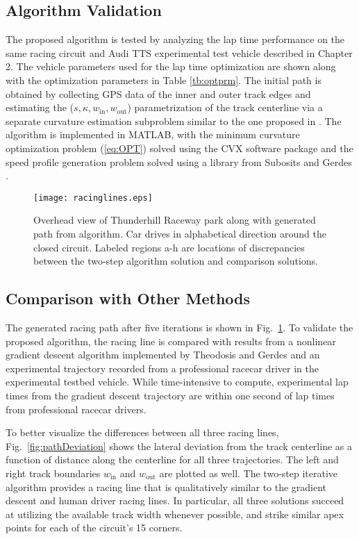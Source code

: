 \subsection{Algorithm Validation}
The proposed algorithm is tested by analyzing the lap time performance on
 the same racing circuit and Audi TTS experimental test vehicle described in
Chapter 2. The vehicle parameters 
used for the lap time optimization are shown along with the optimization parameters in Table \ref{tb:optprm}.
 The initial path is obtained by collecting GPS data of the inner and outer track edges and estimating the ($s, \kappa, w_\mathrm{in}, w_\mathrm{out}$)
 parametrization of the track centerline via a separate curvature estimation subproblem similar to the one proposed in \cite{perantoni}.
 The algorithm is implemented in MATLAB, with the minimum curvature optimization problem (\ref{eq:OPT}) solved using the CVX software package \cite{boydcvx} and
 the speed profile generation problem solved using a library from Subosits and Gerdes \cite{subosits}.

 \begin{figure}
\centering
\texttt{[image: racinglines.eps]}
\caption[Overhead view of Thunderhill Raceway park along with generated path from algorithm.]{Overhead view of Thunderhill Raceway park along with generated path from algorithm. Car drives in alphabetical direction around the closed circuit. Labeled regions a-h are locations of discrepancies between the 
two-step algorithm solution and comparison solutions.}
\label{racingLines}
\end{figure}
\subsection{Comparison with Other Methods}
The generated racing path after five iterations is shown in
Fig.~\ref{racingLines}. To validate the proposed algorithm, the racing line is compared with results from a nonlinear gradient descent algorithm implemented by 
Theodosis and Gerdes \cite{theodosis} and an experimental trajectory recorded from a professional racecar driver in the experimental testbed vehicle.
 While time-intensive to compute, experimental lap times from the gradient descent trajectory are within one second of
lap times from professional racecar drivers. 

To better visualize the differences between all three racing lines, Fig.~\ref{fig:pathDeviation} shows the lateral deviation from the track centerline as a function of distance along the centerline 
for all three trajectories. The left and right track boundaries $w_\mathrm{in}$ and $w_\mathrm{out}$ are plotted as well. The two-step iterative algorithm provides a 
racing line that is qualitatively similar to the gradient descent and human driver racing lines. In particular, all three
solutions succeed at utilizing the available track width whenever possible, and strike similar apex points for each
of the circuit's 15 corners. 


